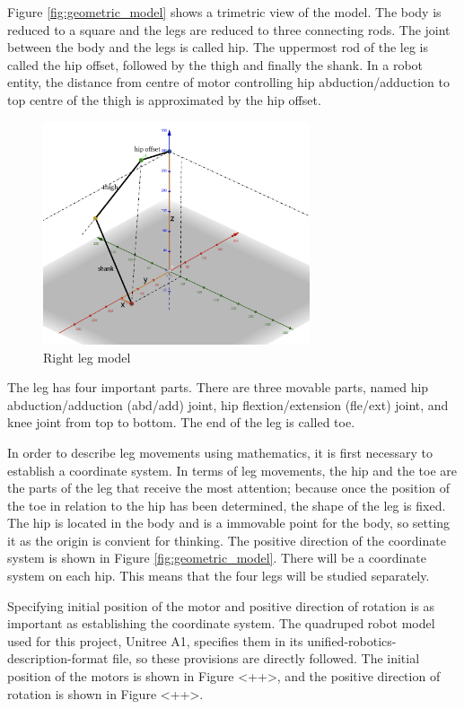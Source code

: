 Figure \ref{fig:geometric_model} shows a trimetric view of the model. The body is reduced to a square and the legs are reduced to three connecting rods. The joint between the body and the legs is called hip. The uppermost rod of the leg is called the hip offset, followed by the thigh and finally the shank. In a robot entity, the distance from centre of motor controlling hip abduction/adduction to top centre of the thigh is approximated by the hip offset.

\begin{figure}[htbp]\label{fig:right_leg_model}
   \centering
   \includegraphics[width=0.7\textwidth]{figures/right_leg_model.jpg}
   \caption{Right leg model}
\end{figure}

The leg has four important parts. There are three movable parts, named hip abduction/adduction (abd/add) joint, hip flextion/extension (fle/ext) joint, and knee joint from top to bottom. The end of the leg is called toe.

In order to describe leg movements using mathematics, it is first necessary to establish a coordinate system. In terms of leg movements, the hip and the toe are the parts of the leg that receive the most attention; because once the position of the toe in relation to the hip has been determined, the shape of the leg is fixed. The hip is located in the body and is a immovable point for the body, so setting it as the origin is convient for thinking. The positive direction of the coordinate system is shown in Figure \ref{fig:geometric_model}. There will be a coordinate system on each hip. This means that the four legs will be studied separately.

Specifying initial position of the motor and positive direction of rotation is as important as establishing the coordinate system. The quadruped robot model used for this project, Unitree A1, specifies them in its unified-robotics-description-format file, so these provisions are directly followed. The initial position of the motors is shown in Figure <++>, and the positive direction of rotation is shown in Figure <++>.

